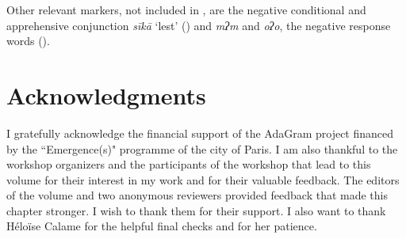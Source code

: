 \documentclass[output=paper,colorlinks,citecolor=brown]{langscibook}
\begin{document}
Other relevant markers, not included in , are the negative conditional and apprehensive conjunction \textit{sīkā} ‘lest’ () and \textit{mʔm} and \textit{oʔo}, the negative response words (). 

\largerpage
\section*{Acknowledgments}
I gratefully acknowledge the financial support of the AdaGram project financed by the “Emergence(s)" programme of the city of Paris. I am also thankful to the workshop organizers and the participants of the workshop that lead to this volume for their interest in my work and for their valuable feedback. The editors of the volume and two anonymous reviewers provided feedback that made this chapter stronger. I wish to thank them for their support. I also want to thank Héloïse Calame for the helpful final checks and for her patience.
\end{document}
